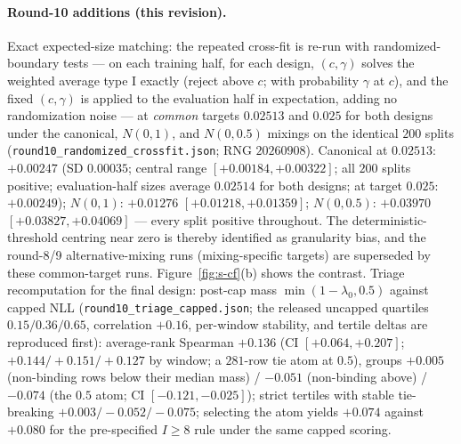 \documentclass[11pt]{article}
\begin{document}
\paragraph{Round-10 additions (this revision).} Exact expected-size
matching: the repeated cross-fit is re-run with randomized-boundary
tests --- on each training half, for each design, $(c, \gamma)$ solves
the weighted average type I exactly (reject above $c$; with probability
$\gamma$ at $c$), and the fixed $(c, \gamma)$ is applied to the
evaluation half in expectation, adding no randomization noise --- at
\emph{common} targets $0.02513$ and $0.025$ for both designs under the
canonical, $N(0,1)$, and $N(0,0.5)$ mixings on the identical $200$
splits (\texttt{round10\_\allowbreak randomized\_crossfit.json}; RNG
$20260908$). Canonical at $0.02513$: $+0.00247$ (SD $0.00035$; central
range $[+0.00184,+0.00322]$; all $200$ splits positive;
evaluation-half sizes average $0.02514$ for both designs; at target
$0.025$: $+0.00249$); $N(0,1)$: $+0.01276$ $[+0.01218,+0.01359]$;
$N(0,0.5)$: $+0.03970$ $[+0.03827,+0.04069]$ --- every split positive
throughout. The deterministic-threshold centring near zero is thereby
identified as granularity bias, and the round-8/9 alternative-mixing
runs (mixing-specific targets) are superseded by these common-target
runs. Figure~\ref{fig:s-cf}(b) shows the contrast. Triage
recomputation for the final design: post-cap mass
$\min(1-\lambda_0, 0.5)$ against capped NLL
(\texttt{round10\_triage\_capped.json}; the released uncapped
quartiles $0.15/0.36/0.65$, correlation $+0.16$, per-window stability,
and tertile deltas are reproduced first): average-rank Spearman
$+0.136$ (CI $[+0.064,+0.207]$; $+0.144/+0.151/+0.127$ by window; a
$281$-row tie atom at $0.5$), groups $+0.005$ (non-binding rows below
their median mass) / $-0.051$ (non-binding above) / $-0.074$ (the
$0.5$ atom; CI $[-0.121,-0.025]$); strict tertiles with stable
tie-breaking $+0.003/-0.052/-0.075$; selecting the atom yields
$+0.074$ against $+0.080$ for the pre-specified $I \ge 8$ rule under
the same capped scoring.
\end{document}

